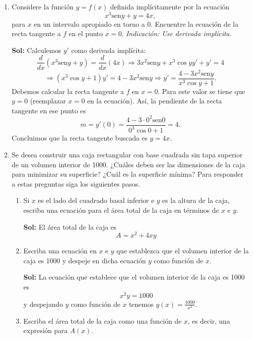 \documentclass[letterpaper,12pt]{article}
\theoremstyle{plain}
\theoremstyle{definition}
\newcommand{\sen}{\text{sen}}
\begin{document}
\begin{enumerate}
\begin{enumerate}
\end{enumerate}

\item Considere la función \( y = f(x) \) definida implícitamente por la ecuación
\[
x^3 \sen y + y = 4x,
\]
para \( x \) en un intervalo apropiado en torno a 0. Encuentre la ecuación de la recta tangente a \( f \) en el punto \( x = 0 \). \textit{Indicación: Use derivada implícita.}

\color{blue}
\textbf{Sol:} Calculemos \( y'\) como derivada implícita:
\[
\frac{d}{dx}(x^3 \sen y + y) = \frac{d}{dx}(4x) \Rightarrow 3x^2 \sen y + x^3 \cos y y' + y' = 4
\]
\[
\Rightarrow (x^3 \cos y + 1)y' = 4 - 3x^2 \sen y \Rightarrow y' = \frac{4 - 3x^2 \sen y}{x^3 \cos y + 1}.
\]
Debemos calcular la recta tangente a \( f \) en \( x = 0 \). Para este valor se tiene que \( y = 0 \) (reemplazar $x=0$ en la ecuación). Así, la pendiente de la recta tangente en ese punto es
\[
m = y'(0) = \frac{4 - 3 \cdot 0^2 \sen 0}{0^3 \cos 0 + 1} = 4.
\]
Concluimos que la recta tangente buscada es \( y = 4x \).
\color{black}

\item Se desea construir una caja rectangular con base cuadrada sin tapa superior de un volumen interior de 1000. ¿Cuáles deben ser las dimensiones de la caja para minimizar su superficie? ¿Cuál es la superficie mínima? Para responder a estas preguntas siga los siguientes pasos.

\begin{enumerate}
    \item Si \( x \) es el lado del cuadrado basal inferior e \( y \) es la altura de la caja, escriba una ecuación para el área total de la caja en términos de \( x \) e \( y \).

\color{blue}
\textbf{Sol:} El área total de la caja es
    \[
    A = x^2 + 4xy 
    \]
\color{black}

    \item Escriba una ecuación en \( x \) e \( y \) que establezca que el volumen interior de la caja es 1000 y despeje en dicha ecuación \( y \) como función de \( x \).

\color{blue}
\textbf{Sol:} La ecuación que establece que el volumen interior de la caja es 1000 es
    \[
    x^2 y = 1000 
    \]
    y despejando \( y \) como función de \( x \) tenemos \( y(x) = \frac{1000}{x^2} \).
\color{black}

    \item Escriba el área total de la caja como una función de \( x \), es decir, una expresión para \( A(x) \).


\end{enumerate}
\end{enumerate}
\end{document}
